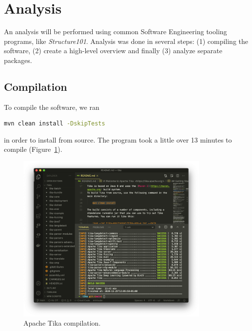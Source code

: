 \documentclass{article}
\begin{document}
\begin{itemize}

\end{itemize}
\section{Analysis}
An analysis will be performed using common Software Engineering tooling programs, like \textit{Structure101}. Analysis was done in several steps: (1) compiling the software, (2) create a high-level overview and finally (3) analyze separate packages.

\subsection{Compilation}
To compile the software, we ran 

\begin{lstlisting}[language=bash]
mvn clean install -DskipTests
\end{lstlisting}

in order to install from source. The program took a little over 13 minutes to compile (Figure~\ref{fig:compilation}).

\begin{figure}[ht]
    \centering
    \includegraphics[width=0.85\textwidth]{report/images/compiling-tika.png}
    \caption{Apache Tika compilation.}
    \label{fig:compilation}
\end{figure}
\end{document}
